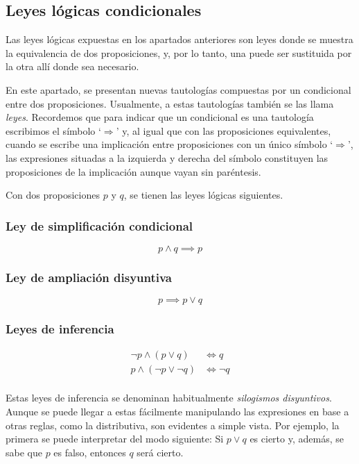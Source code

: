 \subsection{Leyes lógicas condicionales}

Las leyes lógicas expuestas en los apartados anteriores son leyes donde se
muestra la equivalencia de dos proposiciones, y, por lo tanto, una puede ser
sustituida por la otra allí donde sea necesario.

En este apartado, se presentan nuevas tautologías compuestas por un
condicional entre dos proposiciones. Usualmente, a estas tautologías también
se las llama \emph{leyes}. Recordemos que para indicar que un condicional es
una tautología escribimos el símbolo `$\Longrightarrow$' y, al igual que con
las proposiciones equivalentes, cuando se escribe una implicación entre
proposiciones con un único símbolo `$\Longrightarrow$', las expresiones
situadas a la izquierda y derecha del símbolo constituyen las proposiciones
de la implicación aunque vayan sin paréntesis.

Con dos proposiciones $p$ y $q$, se tienen las leyes lógicas siguientes.





\subsubsection{Ley de simplificación condicional}

$$ p \land q \implies p $$




\subsubsection{Ley de ampliación disyuntiva}

$$ p \implies p \lor q $$




\subsubsection{Leyes de inferencia}

\begin{align*}
  \neg p \land (p \lor q) &\iff q \\
  p \land (\neg p \lor \neg q) &\iff \neg q \\
\end{align*}

Estas leyes de inferencia se denominan habitualmente \emph{silogismos
disyuntivos}. Aunque se puede llegar a estas fácilmente manipulando las
expresiones en base a otras reglas, como la distributiva, son evidentes a
simple vista. Por ejemplo, la primera se puede interpretar del modo
siguiente: Si $p \lor q$ es cierto y, además, se sabe que $p$ es falso,
entonces $q$ será cierto.





